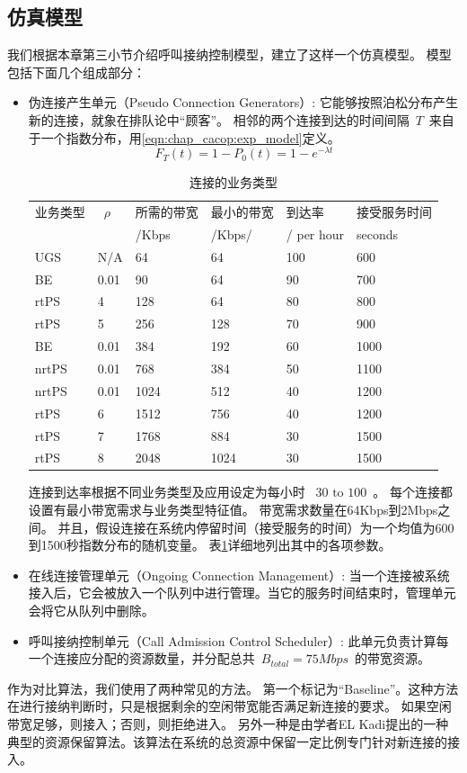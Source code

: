 \subsection{仿真模型}
我们根据本章第三小节介绍呼叫接纳控制模型，建立了这样一个仿真模型。
模型包括下面几个组成部分：
\begin{itemize}
\item 伪连接产生单元（Pseudo Connection Generators）: 它能够按照泊松分布产生新的连接，就象在排队论中“顾客”。
    相邻的两个连接到达的时间间隔~$T$~来自于一个指数分布，用\eqref{eqn:chap_cacop:exp_model}定义。
%
\begin{equation}
\label{eqn:chap_cacop:exp_model}
F_T(t) = 1 - P_0(t) = 1 - e^{-\lambda t}
\end{equation}
%
\begin{table}[tb]
\caption{连接的业务类型} \label{tb:chap_cacop:sim_cfg}
\begin{center}
\wuhao
\begin{tabularx}{0.99\linewidth}{XXXXXp{2.5cm}}
\toprule
业务类型 &~$\rho$~ &所需的带宽 & 最小的带宽 &到达率 &接受服务时间 \\
&&/Kbps& /Kbps/ & / per hour &seconds \\
\midrule
UGS& N/A &64 &64 & 100 &600\\
BE & 0.01&90 &64 &90 &700\\
rtPS &4& 128 &64 &80 &800\\
rtPS &5& 256 &128 &70 &900\\
BE &0.01& 384 &192 &60 &1000\\
nrtPS &0.01& 768 &384 &50 &1100\\
nrtPS &0.01& 1024 &512 &40 &1200\\
rtPS &6& 1512 &756 &40 &1200\\
rtPS &7& 1768 &884 &30 &1500\\
rtPS &8& 2048 &1024 &30 &1500\\
\bottomrule
\end{tabularx}
\end{center}
\end{table}
连接到达率根据不同业务类型及应用设定为每小时 ~$30 \text{ to } 100 $~。
每个连接都设置有最小带宽需求与业务类型特征值。
带宽需求数量在64Kbps到2Mbps之间。
并且，假设连接在系统内停留时间（接受服务的时间）为一个均值为600到1500秒指数分布的随机变量。
表\ref{tb:chap_cacop:sim_cfg}详细地列出其中的各项参数。

\item 在线连接管理单元（Ongoing Connection Management）: 当一个连接被系统接入后，它会被放入一个队列中进行管理。当它的服务时间结束时，管理单元会将它从队列中删除。

\item 呼叫接纳控制单元（Call Admission Control Scheduler）: 此单元负责计算每一个连接应分配的资源数量，并分配总共~$B_{total}=75Mbps$~的带宽资源。 
\end{itemize}
作为对比算法，我们使用了两种常见的方法。
第一个标记为“Baseline”。这种方法在进行接纳判断时，只是根据剩余的空闲带宽能否满足新连接的要求。
如果空闲带宽足够，则接入；否则，则拒绝进入。
另外一种是由学者EL Kadi提出的一种典型的资源保留算法。该算法在系统的总资源中保留一定比例专门针对新连接的接入\cite{EL-Kadi2002}。
